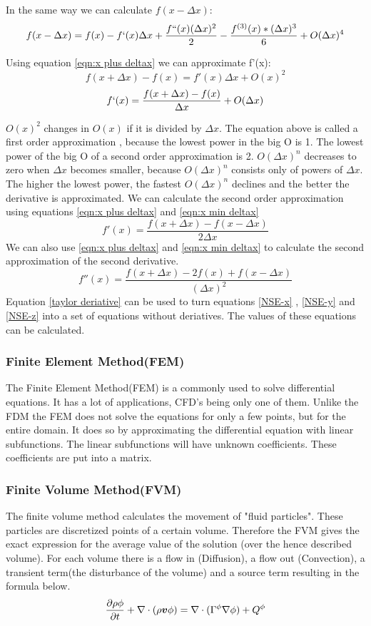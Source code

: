 \documentclass{article}
\begin{document}
In the same way we can calculate $f(x-\Delta x)$:
\begin{equation}f(x- \Delta x)=f(x)-f`(x)\Delta x + \frac{f``(x)(\Delta x)^{2}}{2}-\frac{f^{(3)}(x)*(\Delta x)^{3}}{6} + O(\Delta x) ^{4} \label{eqn:x min deltax}\end{equation}

Using equation \ref{eqn:x plus deltax} we can approximate f'(x):
\[f(x+\Delta x) -f(x) = f'(x)\Delta x + O(x)^{2}\]
\[f`(x)=\frac{f(x+\Delta x) - f(x)}{\Delta x} + O(\Delta x)\]

$O(x)^{2}$ changes in $O(x)$ if it is divided by $\Delta x $. The equation above is called a first order approximation , because the lowest power in the big O is 1. The lowest power of the big O of a second order approximation is 2. $O(\Delta x)^{n}$ decreases to zero when $\Delta x$ becomes smaller, because $O(\Delta x)^{n}$ consists only of powers of $\Delta x$. The higher the lowest power, the fastest $O(\Delta x)^{n}$ declines and the better the derivative is approximated. We can calculate the second order approximation using equations \ref{eqn:x plus deltax} and \ref{eqn:x min deltax}
\begin{equation}f'(x)=\frac{f(x+\Delta x)-f(x-\Delta x)}{2\Delta x}\label{taylor deriative}\end{equation}
We can also use \ref{eqn:x plus deltax} and \ref{eqn:x min deltax} to calculate the second approximation of the second derivative.
\[f''(x)=\frac{f(x+\Delta x)-2f(x)+f(x-\Delta x)}{(\Delta x)^{2}}\]
Equation \ref{taylor deriative} can be used to turn equations \ref{NSE-x} , \ref{NSE-y} and \ref{NSE-z} into a set of equations without deriatives. The values of these equations can be calculated. 

\subsubsection{Finite Element Method(FEM)}
The Finite Element Method(FEM) is a commonly used to solve differential equations. It has a lot of applications, CFD's being only one of them. Unlike the FDM the FEM does not solve the equations for only a few points, but for the entire domain. It does so by approximating the differential equation with linear subfunctions. The linear subfunctions will have unknown coefficients. These coefficients are put into a matrix.

\subsubsection{Finite Volume Method(FVM)}
The finite volume method calculates the movement of "fluid particles". These particles are discretized points of a certain volume.\cite{Finite Volume} Therefore the FVM gives the exact expression for the average value of the solution (over the hence described volume). For each volume there is a flow in (Diffusion), a flow out (Convection), a transient term(the disturbance of the volume) and a source term resulting in the formula below.
\[\pdv{\rho\phi}{t} + \nabla \cdot (\rho\boldsymbol{v}\phi) = \nabla \cdot (\Gamma^\phi\nabla\phi) + Q^\phi\]
\end{document}
